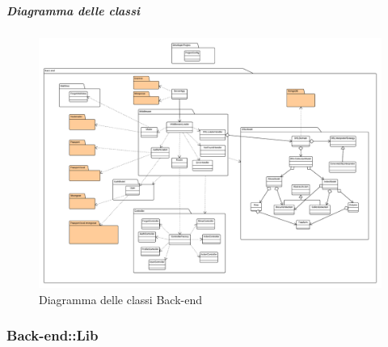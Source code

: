    \subparagraph{Diagramma delle classi}
    \begin{figure}[H] 
      \begin{center} 
        \includegraphics[width=\textwidth]{uml/Back-end-Diagramma delle classi}
        \caption{Diagramma delle classi Back-end}
      \end{center}  
    \end{figure} 
  
  \subsubsection{Back-end::Lib}
